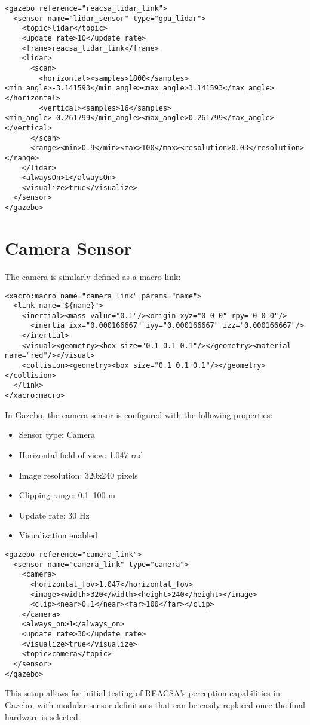 \begin{lstlisting}[basicstyle=\ttfamily\scriptsize]
<gazebo reference="reacsa_lidar_link">
  <sensor name="lidar_sensor" type="gpu_lidar">
    <topic>lidar</topic>
    <update_rate>10</update_rate>
    <frame>reacsa_lidar_link</frame>
    <lidar>
      <scan>
        <horizontal><samples>1800</samples><min_angle>-3.141593</min_angle><max_angle>3.141593</max_angle></horizontal>
        <vertical><samples>16</samples><min_angle>-0.261799</min_angle><max_angle>0.261799</max_angle></vertical>
      </scan>
      <range><min>0.9</min><max>100</max><resolution>0.03</resolution></range>
    </lidar>
    <alwaysOn>1</alwaysOn>
    <visualize>true</visualize>
  </sensor>
</gazebo>
\end{lstlisting}

\section{Camera Sensor}

The camera is similarly defined as a macro link:

\begin{lstlisting}[basicstyle=\ttfamily\scriptsize]
<xacro:macro name="camera_link" params="name">
  <link name="${name}">
    <inertial><mass value="0.1"/><origin xyz="0 0 0" rpy="0 0 0"/>
      <inertia ixx="0.000166667" iyy="0.000166667" izz="0.000166667"/>
    </inertial>
    <visual><geometry><box size="0.1 0.1 0.1"/></geometry><material name="red"/></visual>
    <collision><geometry><box size="0.1 0.1 0.1"/></geometry></collision>
  </link>
</xacro:macro>
\end{lstlisting}

\noindent In Gazebo, the camera sensor is configured with the following properties:

\begin{itemize}
    \item Sensor type: Camera
    \item Horizontal field of view: 1.047 rad
    \item Image resolution: 320x240 pixels
    \item Clipping range: 0.1–100 m
    \item Update rate: 30 Hz
    \item Visualization enabled
\end{itemize}

\begin{lstlisting}[basicstyle=\ttfamily\scriptsize]
<gazebo reference="camera_link">
  <sensor name="camera_link" type="camera">
    <camera>
      <horizontal_fov>1.047</horizontal_fov>
      <image><width>320</width><height>240</height></image>
      <clip><near>0.1</near><far>100</far></clip>
    </camera>
    <always_on>1</always_on>
    <update_rate>30</update_rate>
    <visualize>true</visualize>
    <topic>camera</topic>
  </sensor>
</gazebo>
\end{lstlisting}

\noindent This setup allows for initial testing of REACSA's perception capabilities in Gazebo, with modular sensor definitions that can be easily replaced once the final hardware is selected.
